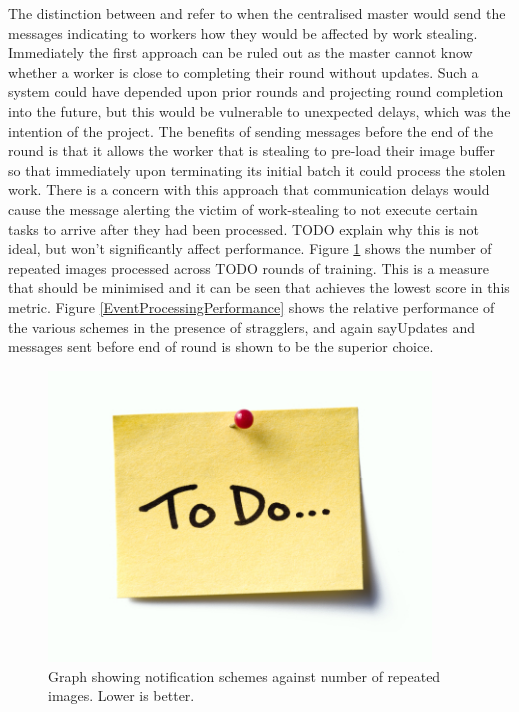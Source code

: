 \documentclass[12pt]{article}
\begin{document}
The distinction between  and  refer to when the centralised master would send the messages indicating to workers how they would be affected by work stealing. Immediately the first approach can be ruled out as the master cannot know whether a worker is close to completing their round without updates. Such a system could have depended upon prior rounds and projecting round completion into the future, but this would be vulnerable to unexpected delays, which was the intention of the project.
\newline
\newline
The benefits of sending messages before the end of the round is that it allows the worker that is stealing to pre-load their image buffer so that immediately upon terminating its initial batch it could process the stolen work. There is a concern with this approach that communication delays would cause the message alerting the victim of work-stealing to not execute certain tasks to arrive after they had been processed. TODO explain why this is not ideal, but won't significantly affect performance.
\newline
\newline
Figure \ref{RepeatedEvents} shows the number of repeated images processed across TODO rounds of training. This is a measure that should be minimised and it can be seen that  achieves the lowest score in this metric. Figure \ref{EventProcessingPerformance} shows the relative performance of the various schemes in the presence of stragglers, and again say{Updates and messages sent before end of round} is shown to be the superior choice.

\begin{figure}[H]
  \centering
  \includegraphics[width=4in]{todo}
  \caption[]{Graph showing notification schemes against number of repeated images. Lower is better.}
  \label{RepeatedEvents}
\end{figure}
\end{document}
